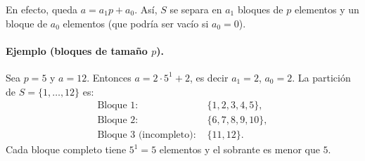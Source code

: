 \documentclass{article}
\begin{document}
En efecto, queda $a=a_1 p + a_0$.  
Así, $S$ se separa en $a_1$ bloques de $p$ elementos y un bloque de $a_0$ elementos (que podría ser vacío si $a_0=0$).

\paragraph{Ejemplo (bloques de tamaño $p$).}
Sea $p=5$ y $a=12$. Entonces $a = 2\cdot5^{1} + 2$, es decir $a_1=2$, $a_0=2$.  
La partición de $S=\{1,\dots,12\}$ es:
\begin{align*}
  \text{Bloque 1: } & \{1,2,3,4,5\},\\
  \text{Bloque 2: } & \{6,7,8,9,10\},\\
  \text{Bloque 3 (incompleto): } & \{11,12\}.
\end{align*}
Cada bloque completo tiene $5^{1}=5$ elementos y el sobrante es menor que $5$.
\end{document}
